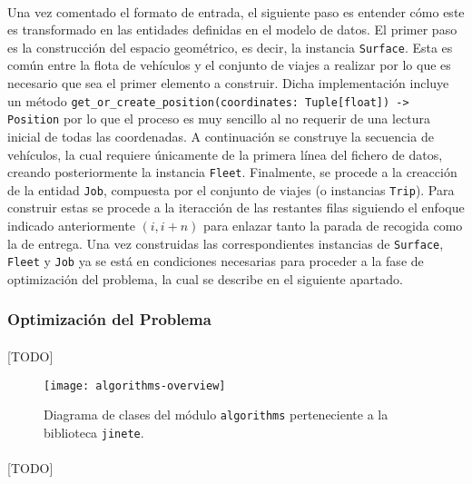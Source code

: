 \documentclass{subfiles}
\begin{document}
          \paragraph{}
          Una vez comentado el formato de entrada, el siguiente paso es entender cómo este es transformado en las entidades definidas en el modelo de datos. El primer paso es la construcción del espacio geométrico, es decir, la instancia \texttt{Surface}. Esta es común entre la flota de vehículos y el conjunto de viajes a realizar por lo que es necesario que sea el primer elemento a construir. Dicha implementación incluye un método \verb|get_or_create_position(coordinates: Tuple[float]) -> Position| por lo que el proceso es muy sencillo al no requerir de una lectura inicial de todas las coordenadas. A continuación se construye la secuencia de vehículos, la cual requiere únicamente de la primera línea del fichero de datos, creando posteriormente la instancia \texttt{Fleet}. Finalmente, se procede a la creacción de la entidad \texttt{Job}, compuesta por el conjunto de viajes (o instancias \texttt{Trip}). Para construir estas se procede a la iteracción de las restantes filas siguiendo el enfoque indicado anteriormente $(i, i+n)$ para enlazar tanto la parada de recogida como la de entrega. Una vez construidas las correspondientes instancias de \texttt{Surface}, \texttt{Fleet} y \texttt{Job} ya se está en condiciones necesarias para proceder a la fase de optimización del problema, la cual se describe en el siguiente apartado.

        \subsubsection{Optimización del Problema}
        \label{sec:implementation_components_optimization}

          \paragraph{}
          [TODO]

          \begin{sidewaysfigure}[ht]
            \centering
            \texttt{[image: algorithms-overview]}
            \caption{Diagrama de clases del módulo \texttt{algorithms} perteneciente a la biblioteca \texttt{jinete}.}
            \label{img:algorithms_overview}
          \end{sidewaysfigure}

          \paragraph{}
          [TODO]
\end{document}
